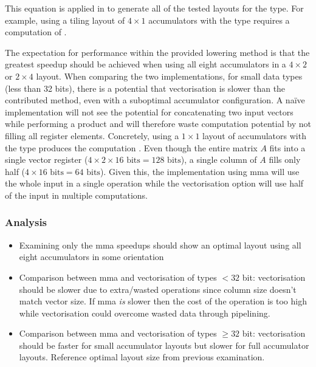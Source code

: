 \documentclass[\main/thesis.tex]{subfiles}
\begin{document}
This equation is applied in  to generate all of the tested layouts for the  type.
For example, using a tiling layout of $4 \times 1$ accumulators with the  type requires a computation of .

The expectation for performance within the provided \gls{lowering} method is that the greatest speedup should be achieved when using all eight accumulators in a $4 \times 2$ or $2 \times 4$ layout.
When comparing the two implementations, for small data types (less than 32 bits), there is a potential that vectorisation is slower than the contributed method, even with a suboptimal accumulator configuration.
A na\"ive implementation will not see the potential for concatenating two input vectors while performing a product and will therefore waste computation potential by not filling all register elements.
Concretely, using a $1 \times 1$ layout of accumulators with the  type produces the computation .
Even though the entire matrix $A$ fits into a single vector register ($4 \times 2 \times 16 \text{ bits} = 128\text{ bits}$), a single column of $A$ fills only half ($4 \times 16 \text{ bits} = 64 \text{ bits}$).
Given this, the implementation using \gls{mma} will use the whole input in a single operation while the \gls{vectorisation} option will use half of the input in multiple computations.

\subsubsection{Analysis}
\label{sec:mlsaAnalysis}
\begin{itemize}
  \item Examining only the mma speedups should show an optimal layout using all eight accumulators in some orientation
  \item
    Comparison between mma and vectorisation of types $<32$ bit: vectorisation should be slower due to extra/wasted operations since column size doesn't match vector size.
    If mma \emph{is} slower then the cost of the operation is too high while vectorisation could overcome wasted data through pipelining.
  \item
    Comparison between mma and vectorisation of types $\geq 32$ bit: vectorisation should be faster for small accumulator layouts but slower for full accumulator layouts.
    Reference optimal layout size from previous examination.
\end{itemize}
\end{document}
